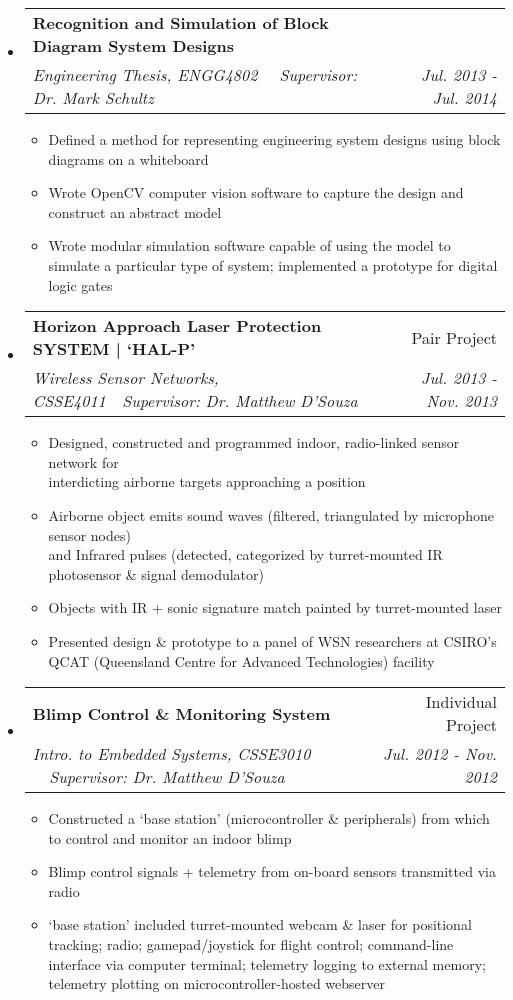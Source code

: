 \documentclass[letterpaper,11pt]{article}
\makeatletter
\newcommand{\resitem}[1]{\item #1 \vspace{-2pt}}
\newcommand{\resheading}[1]{{\large \fcolorbox{black}{mygrey}{\begin{minipage}{\textwidth}{\textbf{#1 \vphantom{p\^{E}}}}\end{minipage}}}}
\newcommand{\ressubheading}[4]{
\begin{tabular*}{7.0in}{l@{\extracolsep{\fill}}r}
		\textbf{#1} & #2 \\
		\textit{#3} & \textit{#4} \\
\end{tabular*}\vspace{-6pt}}
\makeatother
\begin{document}
\pagebreak

\resheading{University Projects}
\begin{itemize}
\item
	\ressubheading{Recognition and Simulation of Block Diagram System Designs}{}{Engineering Thesis, ENGG4802 \ \textbar \ Supervisor: Dr. Mark Schultz}{Jul. 2013 - Jul. 2014}
	\begin{itemize}
		\resitem{Defined a method for representing engineering system designs using block diagrams on a whiteboard}
		\resitem{Wrote OpenCV computer vision software to capture the design and construct an abstract model}
		\resitem{Wrote modular simulation software capable of using the model to simulate a particular type of system; implemented a prototype for digital logic gates}
	\end{itemize}

\item
	\ressubheading{Horizon Approach Laser Protection SYSTEM | `HAL-P'}{Pair Project}{Wireless Sensor Networks, CSSE4011\ \textbar \ Supervisor: Dr. Matthew D'Souza}{Jul. 2013 - Nov. 2013}
	\begin{itemize}
		\resitem{Designed, constructed and programmed indoor, radio-linked sensor network for \\ interdicting airborne targets approaching a position}
		\resitem{Airborne object emits sound waves (filtered, triangulated by microphone sensor nodes) \\ and Infrared pulses (detected, categorized by turret-mounted IR photosensor \& signal demodulator)}
		\resitem{Objects with IR + sonic signature match painted by turret-mounted laser}
		\resitem{Presented design \& prototype to a panel of WSN researchers at CSIRO's QCAT (Queensland Centre for Advanced Technologies) facility}
	\end{itemize}

\item
	\ressubheading{Blimp Control \& Monitoring System}{Individual Project}{Intro. to Embedded Systems, CSSE3010 \ \textbar \ Supervisor: Dr. Matthew D'Souza}{Jul. 2012 - Nov. 2012}
	\begin{itemize}
		\resitem{Constructed a `base station' (microcontroller \& peripherals) from which to control and monitor an indoor blimp}
		\resitem{Blimp control signals + telemetry from on-board sensors transmitted via radio}
		\resitem{`base station' included turret-mounted webcam \& laser for positional tracking; radio; gamepad/joystick for flight control; command-line interface via computer terminal; telemetry logging to external memory; telemetry plotting on microcontroller-hosted webserver}
	\end{itemize}


\end{itemize}
\end{document}
